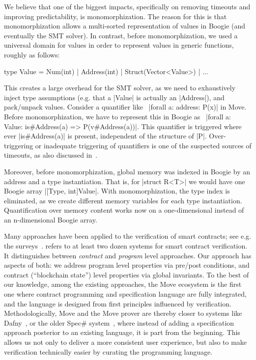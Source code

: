 We believe that one of the biggest impacts, specifically on
removing timeouts and improving predictability, is monomorphization. The
reason for this is that monomorphization allows a multi-sorted representation
of values in Boogie (and eventually the SMT solver). In contrast, before
monomorphization, we used a universal domain for values in order to represent
values in generic functions, roughly as follows:

\begin{Move}
  type Value = Num(int) | Address(int) | Struct(Vector<Value>) | ...
\end{Move}

\noindent This creates a large overhead for the SMT solver, as we need to
exhaustively inject type assumptions (e.g. that a |Value| is actually an
|Address|), and pack/unpack values. Consider a quantifier like~%
|forall a: address: P(x)| in Move. Before monomorphization, we have to represent
this in Boogie as~%
|forall a: Value: is#Address(a) => P(v#Address(a))|. This quantifier is
triggered where ever |is#Address(a)| is present, independent of the structure of
|P|. Over-triggering or inadequate triggering of quantifiers is one of the
suspected sources of timeouts, as also discussed in~\cite{BUTTERFLY}.

Moreover, before monomorphization, global memory was indexed in Boogie by an
address and a type instantiation. That is, for |struct R<T>| we would
have one Boogie array |[Type, int]Value|. With monomorphization, the type index
is eliminated, as we create different memory variables for each type
instantiation.  Quantification over memory content works now on a one-dimensional
instead of an n-dimensional Boogie array.


Many approaches have been applied to the verification of smart contracts; see
e.g. the
surveys~\cite{liu2019survey,CONTRACT_VERIFICATION}. \cite{CONTRACT_VERIFICATION}
refers to at least two dozen systems for smart contract verification. It
distinguishes between \emph{contract} and \emph{program} level approaches. Our
approach has aspects of both: we address program level properties via pre/post
conditions, and contract (``blockchain state'') level properties via global
invariants. To the best of our knowledge, among the existing approaches, the
Move ecosystem is the first one where contract programming and specification
language are fully integrated, and the language is designed from first
principles influenced by verification. Methodologically, Move and the Move
prover are thereby closer to systems like Dafny~\cite{DAFNY}, or the older
Spec\# system~\cite{SPECSHARP}, where instead of adding a specification approach
posterior to an existing language, it is part from the beginning. This allows us
not only to deliver a more consistent user experience, but also to make
verification technically easier by curating the programming language.

